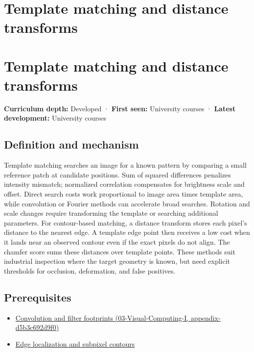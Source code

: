 \hypertarget{appendix-5fb4af80d1c7}{}
\section*{Template matching and distance transforms}
\section{Template matching and distance transforms}\label{template-matching-and-distance-transforms}

\textbf{Curriculum depth:} Developed · \textbf{First seen:} University courses · \textbf{Latest development:} University courses

\subsection{Definition and mechanism}\label{definition-and-mechanism}

Template matching searches an image for a known pattern by comparing a small reference patch at candidate positions. Sum of squared differences penalizes intensity mismatch; normalized correlation compensates for brightness scale and offset. Direct search costs work proportional to image area times template area, while convolution or Fourier methods can accelerate broad searches. Rotation and scale changes require transforming the template or searching additional parameters. For contour-based matching, a distance transform stores each pixel's distance to the nearest edge. A template edge point then receives a low cost when it lands near an observed contour even if the exact pixels do not align. The chamfer score sums these distances over template points. These methods suit industrial inspection where the target geometry is known, but need explicit thresholds for occlusion, deformation, and false positives.

\subsection{Prerequisites}\label{prerequisites}

\begin{itemize}
\tightlist
\item
  \href{}{Convolution and filter footprints (03-Visual-Computing-I, appendix-d5b3c692d9f0)}
\item
  \hyperref[appendix-36022286b03e]{Edge localization and subpixel contours}
\end{itemize}

